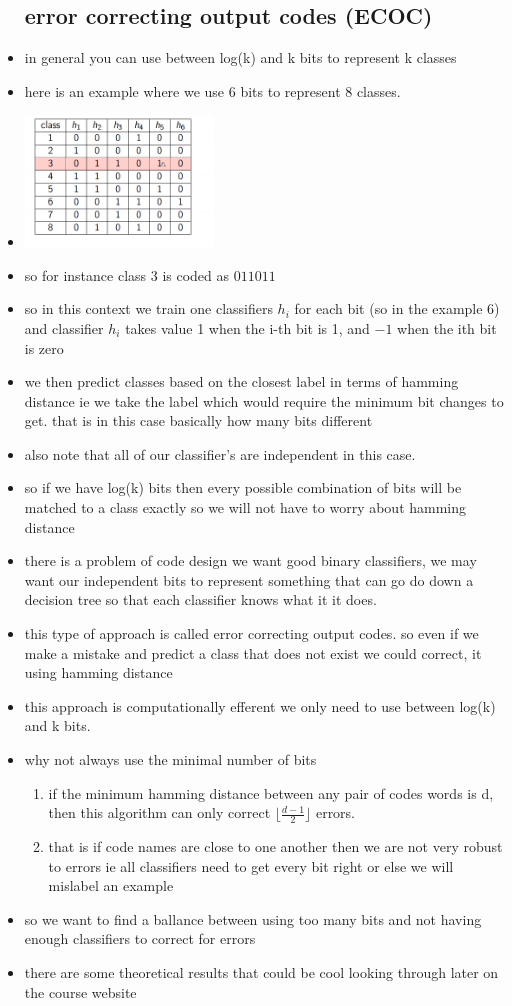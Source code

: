 \documentclass{article}
\begin{document}
\begin{itemize}
\subsection*{error correcting output codes (ECOC) }
\item in general you can use between log(k) and k bits to represent k classes
\item here is an example where we use 6 bits  to represent 8 classes. 
 \item  \includegraphics[width=5cm]{lecture_notes/lecture_8/immages/l8_6.png}
\item so for instance class 3 is coded as $011011$
\item so in this context we train one classifiers $h_i$ for each bit (so in the example 6) and classifier $h_i$ takes value 1 when the i-th bit is 1, and $-1$ when the ith bit is zero
\item we then predict classes based on the closest label in terms of hamming distance ie we take the label which would require the minimum bit changes to get. that is in this case basically how many bits different
\item also note that all of our classifier's are independent in this case.   
\item so if we have log(k) bits then every possible combination of bits will be matched to a class exactly so we will not have to worry about hamming distance 
\item there is a problem of code design we want good binary classifiers, we may want our independent bits to represent something that can go do down a decision tree so that each classifier knows what it it does. 
\item this type of approach is called error correcting output codes. so even if we make a mistake and predict a class that does not exist we could correct, it using hamming distance 
\item this approach is computationally efferent we only need to use between log(k) and k bits. 
\item why not always use the minimal number of bits 
\begin{enumerate}
    \item if the minimum hamming distance between any pair of codes words is d, then this algorithm can only correct $\lfloor\frac{d-1}{2}\rfloor$ errors. 
    \item that is if code names are close to one another then we are not very robust to errors ie all classifiers need to get every bit right or else we will mislabel an example 
\end{enumerate}
\item so we want to find a ballance between using too many bits and not having enough classifiers to correct for errors
\item there are some theoretical results that could be cool looking through later on the course website

\end{itemize}
\end{document}
